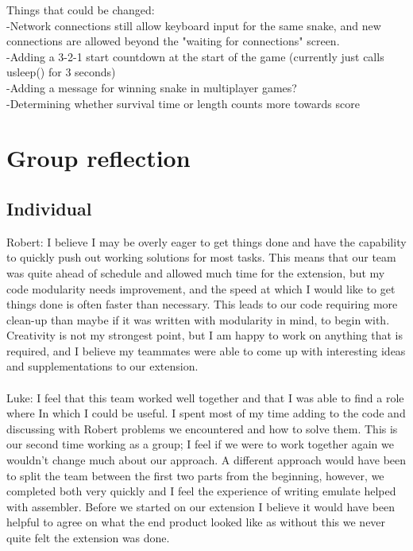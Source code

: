 \documentclass{article}
\begin{document}
Things that could be changed:\\
-Network connections still allow keyboard input for the same snake, and new connections are allowed beyond the "waiting for connections" screen.\\
-Adding a 3-2-1 start countdown at the start of the game (currently just calls usleep() for 3 seconds)\\
-Adding a message for winning snake in multiplayer games?\\
-Determining whether survival time or length counts more towards score\\

\section{Group reflection}
\subsection{Individual}
Robert: I believe I may be overly eager to get things done and have the capability to quickly push out working solutions for most tasks. This means that our team was quite ahead of schedule and allowed much time for the extension, but my code modularity needs improvement, and the speed at which I would like to get things done is often faster than necessary. This leads to our code requiring more clean-up than maybe if it was written with modularity in mind, to begin with. Creativity is not my strongest point, but I am happy to work on anything that is required, and I believe my teammates were able to come up with interesting ideas and supplementations to our extension.
\\\\
Luke: I feel that this team worked well together and that I was able to find a role where In which I could be useful. I spent most of my time adding to the code and discussing with Robert problems we encountered and how to solve them. This is our second time working as a group; I feel if we were to work together again we wouldn't change much about our approach. A different approach would have been to split the team between the first two parts from the beginning, however, we completed both very quickly and I feel the experience of writing emulate helped with assembler. Before we started on our extension I believe it would have been helpful to agree on what the end product looked like as without this we never quite felt the extension was done.
\\\\
\end{document}
